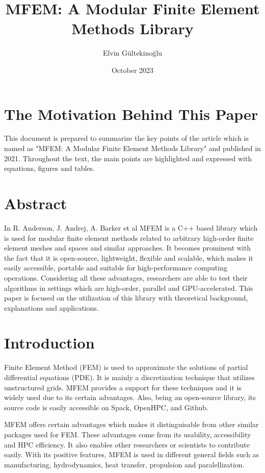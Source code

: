 \documentclass{article}
\title{MFEM: A Modular Finite Element Methods Library}
\author{Elvin Gültekinoğlu }
\date{October 2023}
\begin{document}
\maketitle

\section{The Motivation Behind This Paper}
This document is prepared to summarize the key points of the article which is named as "MFEM: A Modular Finite Element Methods Library" and published in 2021. Throughout the text, the main points are highlighted and expressed with equations, figures and tables. 

\section{Abstract}
In R. Anderson, J. Andrej, A. Barker et al \cite{anderson2021mfem} MFEM is a C++ based library which is used for modular finite element methods related to arbitrary high-order finite element meshes and spaces and similar approaches. It becomes prominent with the fact that it is open-source, lightweight, flexible and scalable, which makes it easily accessible, portable and suitable for high-performance computing operations. Considering all these advantages, researchers are able to test their algorithms in settings which are high-order, parallel and GPU-accelerated. This paper is focused on the utilization of this library with theoretical background, explanations and applications. 

\section{Introduction}
Finite Element Method (FEM) is used to approximate the solutions of partial differential equations (PDE). It is mainly a discretization technique that utilizes unstructured grids. MFEM provides a support for these techniques and it is widely used due to its certain advantages. Also, being an open-source library, its source code is easily accessible on Spack, OpenHPC, and Github. 

MFEM offers certain advantages which makes it distinguisable from other similar packages used for FEM. These advantages come from its usability, accessibility and HPC efficiency. It also enables other researchers or scientists to contribute easily. With its positive features, MFEM is used in different general fields such as manufacturing, hydrodynamics, heat transfer, propulsion and paralellization. 
\end{document}
